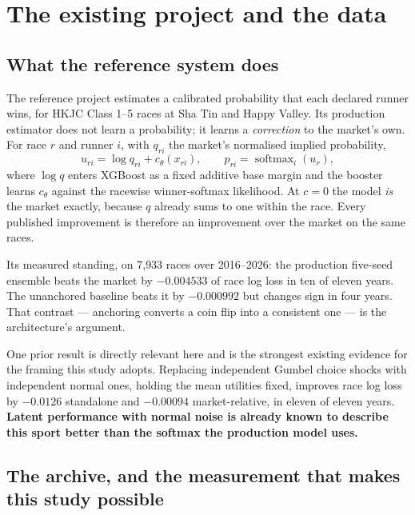 \documentclass[11pt,a4paper]{article}
\begin{document}
\newpage
\section{The existing project and the data}

\subsection{What the reference system does}

The reference project estimates a calibrated probability that each declared runner
wins, for HKJC Class 1--5 races at Sha Tin and Happy Valley. Its production
estimator does not learn a probability; it learns a \emph{correction} to the
market's own. For race $r$ and runner $i$, with $q_{ri}$ the market's normalised
implied probability,
\[
u_{ri}=\log q_{ri}+c_\theta(x_{ri}),
\qquad
p_{ri}=\operatorname{softmax}_i(u_r),
\]
where $\log q$ enters XGBoost as a fixed additive base margin and the booster
learns $c_\theta$ against the racewise winner-softmax likelihood. At $c=0$ the
model \emph{is} the market exactly, because $q$ already sums to one within the
race. Every published improvement is therefore an improvement over the market on
the same races.

Its measured standing, on 7{,}933 races over 2016--2026: the production five-seed
ensemble beats the market by $-0.004533$ of race log loss in ten of eleven years.
The unanchored baseline beats it by $-0.000992$ but changes sign in four years.
That contrast --- anchoring converts a coin flip into a consistent one --- is the
architecture's argument.

One prior result is directly relevant here and is the strongest existing evidence
for the framing this study adopts. Replacing independent Gumbel choice shocks with
independent normal ones, holding the mean utilities fixed, improves race log loss
by $-0.0126$ standalone and $-0.00094$ market-relative, in eleven of eleven years.
\textbf{Latent performance with normal noise is already known to describe this
sport better than the softmax the production model uses.}

\subsection{The archive, and the measurement that makes this study possible}
\end{document}
